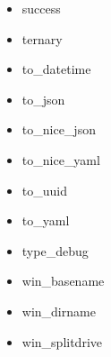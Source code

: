 \documentclass[pdf]{beamer}
\begin{document}
\begin{frame}
\begin{multicols*}{5}
\begin{itemize}
      \item[] success
      \item[] ternary
      \item[] to\_datetime
      \item[] to\_json
      \item[] to\_nice\_json
      \item[] to\_nice\_yaml
      \item[] to\_uuid
      \item[] to\_yaml
      \item[] type\_debug
      \item[] win\_basename
      \item[] win\_dirname
      \item[] win\_splitdrive
    \end{itemize}
  \end{multicols*}
\end{frame}
\end{document}
